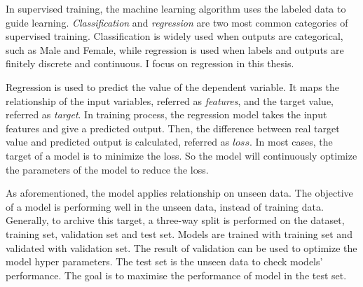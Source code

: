 \documentclass[12pt,a4paper,english
]{tunithesis}
\begin{document}
In supervised training, the machine learning algorithm uses the labeled data to guide learning. \textit{Classification} and \textit{regression} are two most common categories of supervised training. Classification is widely used when outputs are categorical, such as Male and Female, while regression is used when labels and outputs are finitely discrete and continuous. I focus on regression in this thesis. \parencite{sagar2024}

Regression is used to predict the value of the dependent variable. It maps the relationship of the input variables, referred as \textit{features}, and the target value, referred as \textit{target}. In training process, the regression model takes the input features and give a predicted output. Then, the difference between real target value and predicted output is calculated, referred as $loss$. In most cases, the target of a model is to minimize the loss. So the model will continuously optimize the parameters of the model to reduce the loss. \parencite{sagar2024, kevin2012}

As aforementioned, the model applies relationship on unseen data. The objective of a model is performing well in the unseen data, instead of training data. Generally, to archive this target, a three-way split is performed on the dataset, training set, validation set and test set. Models are trained with training set and validated with validation set. The result of validation can be used to optimize the model hyper parameters. The test set is the unseen data to check models' performance. The goal is to maximise the performance of model in the test set. \parencite{stanford_ml}
\end{document}
